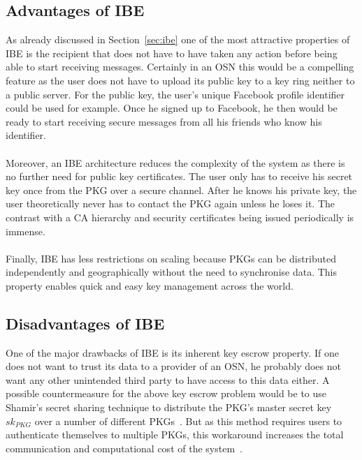 \documentclass[journal]{IEEEtran}
\begin{document}
\subsection{Advantages of IBE}
As already discussed in Section~\ref{sec:ibe} one of the most attractive
properties of IBE is the recipient that does not have to have taken any action
before being able to start receiving messages. Certainly in an OSN this would
be a compelling feature as the user does not have to upload its public key to a
key ring neither to a public server. For the public key, the user's unique
Facebook profile identifier could be used for example.  Once he signed up to
Facebook, he then would be ready to start receiving secure messages from all
his friends who know his identifier.\\
\\
Moreover, an IBE architecture reduces the complexity of the system as there is
no further need for public key certificates. The user only has to receive his
secret key once from the PKG over a secure channel. After he knows his private
key, the user theoretically never has to contact the PKG again unless he loses
it. The contrast with a CA hierarchy and security certificates being issued
periodically is immense.\\
\\
Finally, IBE has less restrictions on scaling because PKGs can be distributed
independently and geographically without the need to synchronise data. This
property enables quick and easy key management across the
world.~\cite{VoltageIBE}

\subsection{Disadvantages of IBE}\label{sec:possible-workarounds}
One of the major drawbacks of IBE is its inherent key escrow property. If one
does not want to trust its data to a provider of an OSN, he probably does
not want any other unintended third party to have access to this data either. A
possible countermeasure for the above key escrow problem would be to use
Shamir's secret sharing technique to distribute the PKG's master secret key
$sk_{PKG}$ over a number of different PKGs~\cite{BonehFranklinIBE}. But as this
method requires users to authenticate themselves to multiple PKGs, this
workaround increases the total communication and computational cost of the
system~\cite{Baek04asurvey}.
\end{document}
